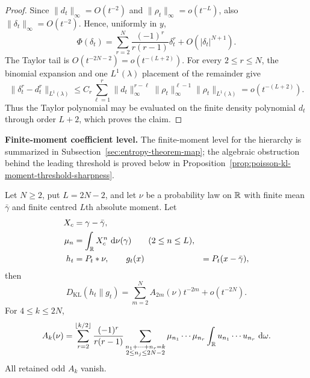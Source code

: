 \ifdefined\JFAArticleMain
{}
\else
\begin{proof}
Since \(\|d_t\|_\infty=O(t^{-2})\) and
\(\|\rho_t\|_\infty=o(t^{-L})\), also
\(\|\delta_t\|_\infty=O(t^{-2})\).  Hence, uniformly in \(y\),
\[
\Phi(\delta_t)=
\sum_{r=2}^{N}\frac{(-1)^r}{r(r-1)}\delta_t^r
+O(|\delta_t|^{N+1}).
\]
The Taylor tail is \(O(t^{-2N-2})=o(t^{-(L+2)})\).  For every
\(2\le r\le N\), the binomial expansion and one \(L^1(\lambda)\) placement
of the remainder give
\[
\|\delta_t^r-d_t^r\|_{L^1(\lambda)}
\le
C_r\sum_{\ell=1}^{r}
\|d_t\|_\infty^{r-\ell}
\|\rho_t\|_\infty^{\ell-1}
\|\rho_t\|_{L^1(\lambda)}
=o(t^{-(L+2)}).
\]
Thus the Taylor polynomial may be evaluated on the finite density polynomial
\(d_t\) through order \(L+2\), which proves the claim.
\end{proof}
\fi

\medskip
{}\label{par:coefficient-evaluability-scope}
\noindent\textbf{Finite-moment coefficient level.}
The finite-moment level for the hierarchy is summarized in
Subsection~\ref{sec:entropy-theorem-map}; the algebraic obstruction
behind the leading threshold is proved below in
Proposition~\ref{prop:poisson-kl-moment-threshold-sharpness}.
\medskip

\begin{theorem}%
\label{thm:poisson-kl-even-orders}
Let \(N\ge2\), put \(L=2N-2\), and let \(\nu\) be a probability law on
\(\mathbb{R}\) with finite mean \(\bar{\gamma}\) and finite centred \(L\)th absolute
moment.  Let
\[
\begin{aligned}
X_c&=\gamma-\bar{\gamma},\\
\mu_n&=\int_{\mathbb{R}} X_c^n\,\,\mathrm{d}\nu(\gamma)\qquad(2\le n\le L),\\
h_t&=P_t*\nu,\qquad
g_t(x)&=P_t(x-\bar{\gamma}),
\end{aligned}
\]
then
\begin{equation}\label{eq:poisson-kl-even-orders}
D_{\mathrm{KL}}(h_t\|g_t)
=\sum_{m=2}^{N}A_{2m}(\nu)t^{-2m}+o(t^{-2N}).
\end{equation}
For \(4\le k\le2N\),
\begin{equation}\label{eq:coefficient-identification-transfer-expansion}
A_k(\nu)=
\sum_{r=2}^{\lfloor k/2\rfloor}
\frac{(-1)^r}{r(r-1)}
\sum_{\substack{n_1+\cdots+n_r=k\\2\le n_j\le2N-2}}
\mu_{n_1}\cdots\mu_{n_r}
\int_{\mathbb{R}}u_{n_1}\cdots u_{n_r}\,\,\mathrm{d}\omega .
\end{equation}
All retained odd \(A_k\) vanish.
\end{theorem}

